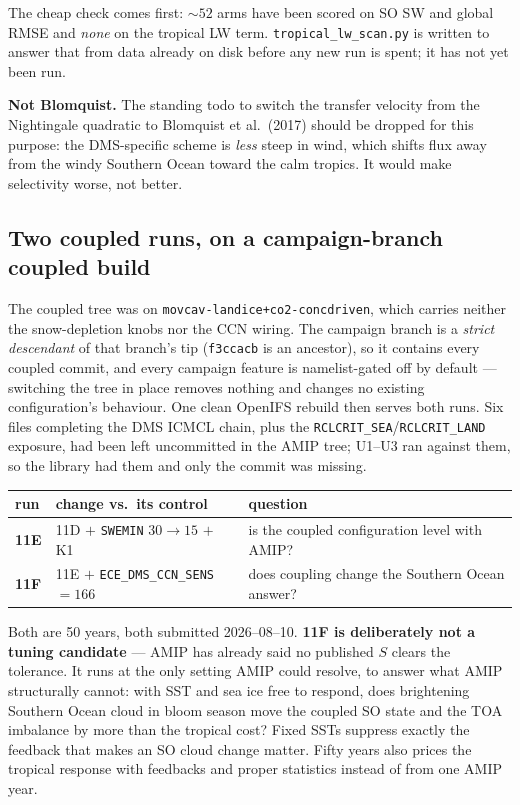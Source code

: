 \documentclass[10pt]{article}
\begin{document}
\noindent The cheap check comes first: ${\sim}52$ arms have been scored on SO SW and global
RMSE and \emph{none} on the tropical LW term. \texttt{tropical\_lw\_scan.py} is written to
answer that from data already on disk before any new run is spent; it has not yet been run.

\textbf{Not Blomquist.} The standing todo to switch the transfer velocity from the
Nightingale quadratic to Blomquist et al.\ (2017) should be dropped for this purpose: the
DMS-specific scheme is \emph{less} steep in wind, which shifts flux away from the windy
Southern Ocean toward the calm tropics. It would make selectivity worse, not better.

\subsection{Two coupled runs, on a campaign-branch coupled build}\label{sub:r26coupled}
The coupled tree was on \texttt{movcav-landice+co2-concdriven}, which carries neither the
snow-depletion knobs nor the CCN wiring. The campaign branch is a \emph{strict descendant}
of that branch's tip (\texttt{f3ccacb} is an ancestor), so it contains every coupled commit,
and every campaign feature is namelist-gated off by default --- switching the tree in place
removes nothing and changes no existing configuration's behaviour. One clean OpenIFS rebuild
then serves both runs. Six files completing the DMS ICMCL chain, plus the
\texttt{RCLCRIT\_SEA}/\texttt{RCLCRIT\_LAND} exposure, had been left uncommitted in the AMIP
tree; U1--U3 ran against them, so the library had them and only the commit was missing.

\begin{center}\footnotesize
\begin{tabular}{l l l}
\toprule
run & change vs.\ its control & question \\
\midrule
\textbf{11E} & 11D $+$ \texttt{SWEMIN} $30\to15$ $+$ K1 & is the coupled configuration level
with AMIP? \\
\textbf{11F} & 11E $+$ \texttt{ECE\_DMS\_CCN\_SENS}$=166$ & does coupling change the
Southern Ocean answer? \\
\bottomrule
\end{tabular}
\end{center}

\noindent Both are 50 years, both submitted 2026--08--10. \textbf{11F is deliberately not a
tuning candidate} --- AMIP has already said no published $S$ clears the tolerance. It runs at
the only setting AMIP could resolve, to answer what AMIP structurally cannot: with SST and
sea ice free to respond, does brightening Southern Ocean cloud in bloom season move the
coupled SO state and the TOA imbalance by more than the tropical cost? Fixed SSTs suppress
exactly the feedback that makes an SO cloud change matter. Fifty years also prices the
tropical response with feedbacks and proper statistics instead of from one AMIP year.
\end{document}
